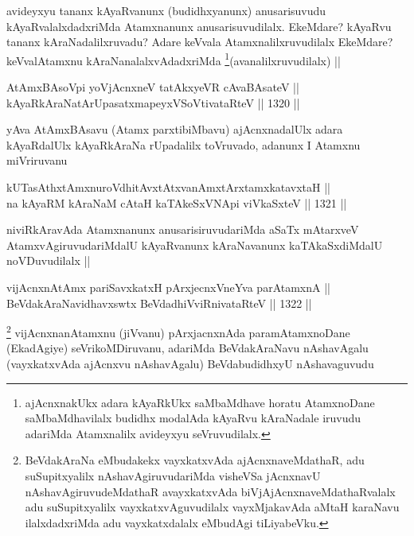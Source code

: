 \begin{artha}
avideyxyu tananx kAyaRvanunx (budidhxyanunx) anusarisuvudu kAyaRvalalxdadxriMda Atamxnanunx anusarisuvudilalx. EkeMdare? kAyaRvu tananx kAraNadalilxruvadu? Adare keVvala Atamxnalilxruvudilalx EkeMdare? keVvalAtamxnu kAraNanalalxvAdadxriMda \footnote{ajAcnxnakUkx adara kAyaRkUkx saMbaMdhave horatu AtamxnoDane saMbaMdhavilalx budidhx modalAda kAyaRvu kAraNadale iruvudu adariMda Atamxnalilx avideyxyu seVruvudilalx.}(avanalilxruvudilalx) ||
\end{artha}


\begin{shl}
AtAmxBAsoV\s pi yoV\s jAcnxneV tatAkxyeVR cAvaBAsateV || \\
kAyaRkAraNatArUpasatxmapeyxVSoV\s tivataRteV ||  1320 ||  
\end{shl}

\begin{artha}
yAva AtAmxBAsavu (Atamx parxtibiMbavu) ajAcnxnadalUlx adara kAyaRdalUlx kAyaRkAraNa rUpadalilx toVruvado, adanunx I Atamxnu miVriruvanu
\end{artha}

\begin{shl}
kUTasAthxtAmxnuroVdhitAvxtAtxvanAmxtArxtamxkatavxtaH || \\
na kAyaRM kAraNaM cAtaH kaTAkeSxVNApi viVkaSxteV ||  1321 ||  
\end{shl}

\begin{artha}
niviRkAravAda Atamxnanunx anusarisiruvudariMda aSaTx mAtarxveV AtamxvAgiruvudariMdalU kAyaRvanunx kAraNavanunx kaTAkaSxdiMdalU noVDuvudilalx ||
\end{artha}



\begin{shl}
vijAcnxnAtAmx pariSavxkatxH pArxjecnxVneYva parAtamxnA || \\
BeVdakAraNavidhavxswtx BeVdadhiVviRnivataRteV ||  1322 ||  
\end{shl}

\begin{artha}
\footnote{BeVdakAraNa eMbudakekx vayxkatxvAda ajAcnxnaveMdathaR, adu suSupitxyalilx nAshavAgiruvudariMda visheVSa jAcnxnavU nAshavAgiruvudeMdathaR avayxkatxvAda biVjAjAcnxnaveMdathaRvalalx adu suSupitxyalilx vayxkatxvAguvudilalx vayxMjakavAda aMtaH karaNavu ilalxdadxriMda adu vayxkatxdalalx eMbudAgi tiLiyabeVku.}
vijAcnxnanAtamxnu (jiVvanu) pArxjacnxnAda paramAtamxnoDane (EkadAgiye) seVrikoMDiruvanu, adariMda BeVdakAraNavu nAshavAgalu (vayxkatxvAda ajAcnxvu nAshavAgalu) BeVdabudidhxyU nAshavaguvudu 
\end{artha}

